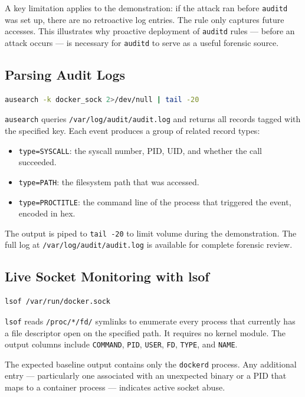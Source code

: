 A key limitation applies to the demonstration: if the attack ran before \texttt{auditd} was set up, there are no retroactive log entries. The rule only captures future accesses. This illustrates why proactive deployment of \texttt{auditd} rules --- before an attack occurs --- is necessary for \texttt{auditd} to serve as a useful forensic source.

\subsection{Parsing Audit Logs}

\begin{lstlisting}[language=bash]
ausearch -k docker_sock 2>/dev/null | tail -20
\end{lstlisting}

\texttt{ausearch} queries \texttt{/var/log/audit/audit.log} and returns all records tagged with the specified key. Each event produces a group of related record types:

\begin{itemize}
    \item \texttt{type=SYSCALL}: the syscall number, PID, UID, and whether the call succeeded.
    \item \texttt{type=PATH}: the filesystem path that was accessed.
    \item \texttt{type=PROCTITLE}: the command line of the process that triggered the event, encoded in hex.
\end{itemize}

The output is piped to \texttt{tail -20} to limit volume during the demonstration. The full log at \texttt{/var/log/audit/audit.log} is available for complete forensic review.

\subsection{Live Socket Monitoring with lsof}

\begin{lstlisting}[language=bash]
lsof /var/run/docker.sock
\end{lstlisting}

\texttt{lsof} reads \texttt{/proc/*/fd/} symlinks to enumerate every process that currently has a file descriptor open on the specified path. It requires no kernel module. The output columns include \texttt{COMMAND}, \texttt{PID}, \texttt{USER}, \texttt{FD}, \texttt{TYPE}, and \texttt{NAME}.

The expected baseline output contains only the \texttt{dockerd} process. Any additional entry --- particularly one associated with an unexpected binary or a PID that maps to a container process --- indicates active socket abuse.

